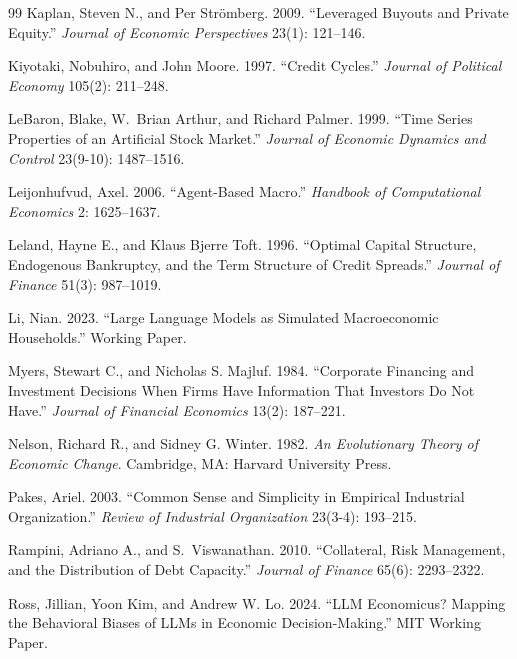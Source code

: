 \documentclass[11pt]{article}
\begin{document}
\begin{thebibliography}{99}
Kaplan, Steven N., and Per Strömberg. 2009. ``Leveraged Buyouts and
Private Equity.'' \textit{Journal of Economic Perspectives} 23(1):
121--146.

Kiyotaki, Nobuhiro, and John Moore. 1997. ``Credit Cycles.''
\textit{Journal of Political Economy} 105(2): 211--248.

LeBaron, Blake, W.~Brian Arthur, and Richard Palmer. 1999. ``Time
Series Properties of an Artificial Stock Market.''
\textit{Journal of Economic Dynamics and Control} 23(9-10):
1487--1516.

Leijonhufvud, Axel. 2006. ``Agent-Based Macro.'' \textit{Handbook
of Computational Economics} 2: 1625--1637.

Leland, Hayne E., and Klaus Bjerre Toft. 1996. ``Optimal Capital
Structure, Endogenous Bankruptcy, and the Term Structure of Credit
Spreads.'' \textit{Journal of Finance} 51(3): 987--1019.

Li, Nian. 2023. ``Large Language Models as Simulated Macroeconomic
Households.'' Working Paper.

Myers, Stewart C., and Nicholas S. Majluf. 1984. ``Corporate Financing
and Investment Decisions When Firms Have Information That Investors
Do Not Have.'' \textit{Journal of Financial Economics} 13(2):
187--221.

Nelson, Richard R., and Sidney G. Winter. 1982. \textit{An Evolutionary
Theory of Economic Change}. Cambridge, MA: Harvard University Press.

Pakes, Ariel. 2003. ``Common Sense and Simplicity in Empirical
Industrial Organization.'' \textit{Review of Industrial Organization}
23(3-4): 193--215.

Rampini, Adriano A., and S.~Viswanathan. 2010. ``Collateral, Risk
Management, and the Distribution of Debt Capacity.''
\textit{Journal of Finance} 65(6): 2293--2322.

Ross, Jillian, Yoon Kim, and Andrew W. Lo. 2024. ``LLM Economicus?
Mapping the Behavioral Biases of LLMs in Economic Decision-Making.''
MIT Working Paper.


\end{thebibliography}
\end{document}
